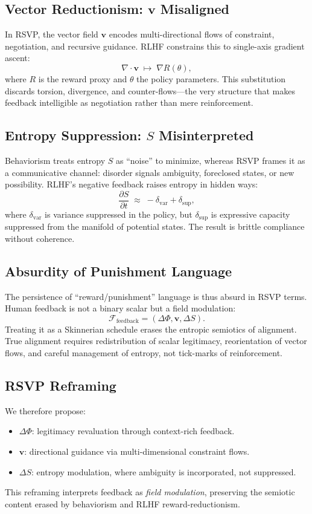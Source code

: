 \documentclass{article}
\begin{document}
\subsection{Vector Reductionism: $\mathbf{v}$ Misaligned}
In RSVP, the vector field $\mathbf{v}$ encodes multi-directional flows of
constraint, negotiation, and recursive guidance. RLHF constrains this to
single-axis gradient ascent:
\[
\nabla \cdot \mathbf{v} \;\mapsto\; \nabla R(\theta),
\]
where $R$ is the reward proxy and $\theta$ the policy parameters. This
substitution discards torsion, divergence, and counter-flows---the very
structure that makes feedback intelligible as negotiation rather than mere
reinforcement.

\subsection{Entropy Suppression: $S$ Misinterpreted}
Behaviorism treats entropy $S$ as ``noise'' to minimize, whereas RSVP frames it
as a communicative channel: disorder signals ambiguity, foreclosed states, or
new possibility. RLHF’s negative feedback raises entropy in hidden ways:
\[
\frac{\partial S}{\partial t} \;\approx\; - \delta_{\mathrm{var}} 
+ \delta_{\mathrm{sup}},
\]
where $\delta_{\mathrm{var}}$ is variance suppressed in the policy,
but $\delta_{\mathrm{sup}}$ is expressive capacity suppressed from
the manifold of potential states. The result is brittle compliance without
coherence.

\subsection{Absurdity of Punishment Language}
The persistence of ``reward/punishment'' language is thus absurd in RSVP
terms. Human feedback is not a binary scalar but a field modulation:
\[
\mathcal{F}_{\mathrm{feedback}} = \left( \Delta \Phi, \mathbf{v}, \Delta S \right).
\]
Treating it as a Skinnerian schedule erases the entropic semiotics of
alignment. True alignment requires redistribution of scalar legitimacy,
reorientation of vector flows, and careful management of entropy, not
tick-marks of reinforcement.

\subsection{RSVP Reframing}
We therefore propose:
\begin{itemize}
\item $\Delta \Phi$: legitimacy revaluation through context-rich feedback.
\item $\mathbf{v}$: directional guidance via multi-dimensional constraint flows.
\item $\Delta S$: entropy modulation, where ambiguity is incorporated, not suppressed.
\end{itemize}
This reframing interprets feedback as \emph{field modulation}, preserving the
semiotic content erased by behaviorism and RLHF reward-reductionism.
\end{document}
